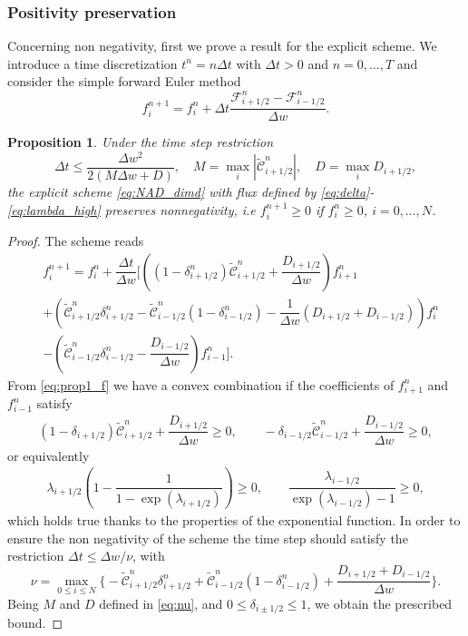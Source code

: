 \documentclass[a4paper]{article}
\newtheorem{proposition}{Proposition}
\theoremstyle{remark}\newtheorem{remark}{Remark}
\newcommand{\F}{\mathcal{F}}
\newcommand{\C}{\mathcal{C}}
\newcommand{\be}{\begin{equation}}
\newcommand{\ee}{\end{equation}}
\begin{document}
\subsubsection{Positivity preservation}
Concerning non negativity, first we prove a result for the explicit scheme. We introduce a time discretization $t^n=n\Delta t$ with $\Delta t>0$ and $n = 0,\dots,T$ and consider the simple forward Euler method
\be\label{eq:NAD_dimd}
f^{n+1}_i=f^n_i + \Delta t \dfrac{\F_{i+1/2}^n-\F_{i-1/2}^n}{\Delta w}.
\ee  
\begin{proposition}
Under the time step restriction 
\be
\Delta t\le \dfrac{\Delta w^2}{2(M\Delta w+D)},\quad
M = \max_{i} |\tilde{\C}_{i+1/2}^n|,\quad D = \max_{i} {D}_{i+1/2}, 
\label{eq:nu}
\ee
the explicit scheme \eqref{eq:NAD_dimd} with flux defined by \eqref{eq:delta}-\eqref{eq:lambda_high} preserves nonnegativity, i.e 
$ f^{n+1}_i\ge 0$ if $f^n_i\ge 0$, $i=0,\dots,N$. 
\end{proposition}
\begin{proof}
The scheme reads
\be\begin{split}\label{eq:prop1_f}
& f_i^{n+1} = f_i^n + \dfrac{\Delta t}{\Delta w}\Bigg[ \left( (1-\delta_{i+1/2}^n)\tilde{\C}_{i+1/2}^{n}+\dfrac{D_{i+1/2}}{\Delta w} \right)f_{i+1}^n\\
& +\left(\tilde{\C}_{i+1/2}^n\delta_{i+1/2}^n-\tilde{\C}_{i-1/2}^n(1-\delta_{i-1/2}^n)-\dfrac{1}{\Delta w}(D_{i+1/2}+D_{i-1/2})\right)f_i^n \\
&- \left(\tilde{\C}^n_{i-1/2}\delta_{i-1/2}^n-\dfrac{D_{i-1/2}}{\Delta w}\right)f_{i-1}^n \Bigg].
\end{split}\ee
From \eqref{eq:prop1_f} we have a convex combination if the coefficients of $f_{i+1}^n$ and $f_{i-1}^n$  satisfy
\[
\begin{split}
(1-\delta_{i+1/2})\tilde{\C}_{i+1/2}^n+\dfrac{D_{i+1/2}}{\Delta w}\ge 0, \qquad
-\delta_{i-1/2}\tilde{\C}_{i-1/2}^n+\dfrac{D_{i-1/2}}{\Delta w}\ge 0,
\end{split}
\]
or equivalently 
\[
\begin{split}
\lambda_{i+1/2}\left(1-\dfrac{1}{1-\exp{(\lambda_{i+1/2})}}\right)\ge 0, \qquad \dfrac{\lambda_{i-1/2}}{\exp{(\lambda_{i-1/2})}-1}\ge 0,
\end{split}
\]
which holds true thanks to the properties of the exponential function. In order to ensure the non negativity of the scheme the time step should satisfy the restriction $\Delta t\le {\Delta w}/{\nu}$, with 
\[
\nu = \max_{0\le i\le N} \Big\{ -\tilde{\C}_{i+1/2}^n\delta^n_{i+1/2}+\tilde{\C}_{i-1/2}^n(1-\delta_{i-1/2}^n)+\dfrac{D_{i+1/2}+D_{i-1/2}}{\Delta w} \Big\}.
\]
Being $M$ and $D$ defined in \eqref{eq:nu}, and $0\le \delta_{i\pm 1/2}\le 1$, we obtain the prescribed bound. 
\end{proof}
\end{document}
